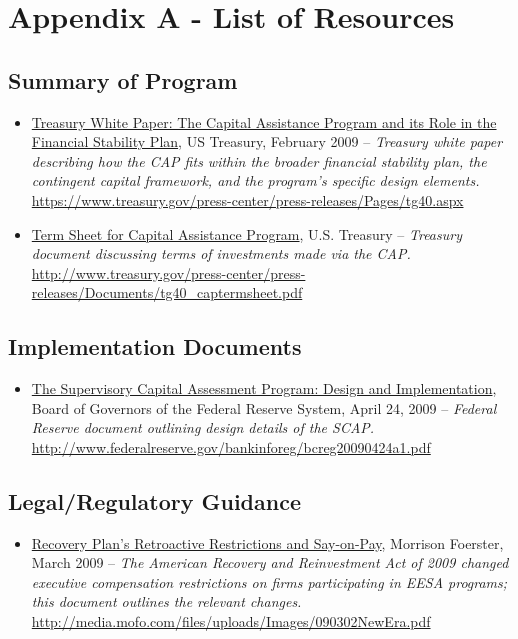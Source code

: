 \documentclass[12pt]{article}
\begin{document}


\nocite{*}


\section{Appendix A - List of Resources}

\subsection{Summary of Program}

\begin{itemize}

\item
\ul{Treasury White Paper: The Capital Assistance Program and its Role in the Financial Stability Plan}, US Treasury, February 2009 -- \emph{Treasury white paper describing how the CAP fits within the broader financial stability plan, the contingent capital framework, and the program's specific design elements.} \url{https://www.treasury.gov/press-center/press-releases/Pages/tg40.aspx}
\item
\ul{Term
  Sheet for Capital Assistance Program}, U.S. Treasury -- \emph{Treasury
  document discussing terms of investments made via the CAP.} \url{http://www.treasury.gov/press-center/press-releases/Documents/tg40_captermsheet.pdf}
\end{itemize}

\subsection{Implementation Documents}
\begin{itemize}
\item
\ul{The
  Supervisory Capital Assessment Program: Design and Implementation},
  Board of Governors of the Federal Reserve System, April 24, 2009 -- \emph{Federal Reserve document outlining design details of the SCAP.} \url{http://www.federalreserve.gov/bankinforeg/bcreg20090424a1.pdf}
\end{itemize}

\subsection{Legal/Regulatory Guidance}

\begin{itemize}
\item
\ul{Recovery Plan's Retroactive Restrictions and Say-on-Pay}, Morrison Foerster, March 2009 -- \emph{The American Recovery and Reinvestment Act of 2009 changed executive compensation restrictions on firms participating in EESA programs; this document outlines the relevant changes.} \url{http://media.mofo.com/files/uploads/Images/090302NewEra.pdf}
\end{itemize}
\end{document}
